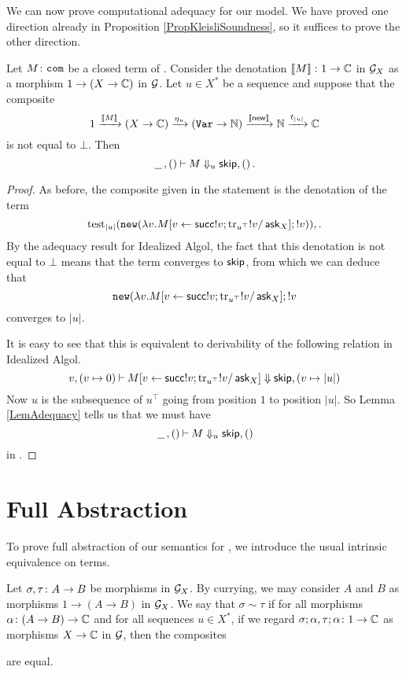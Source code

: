 \documentclass[11pt]{report}
\begin{document}
We can now prove computational adequacy for our model.
We have proved one direction already in Proposition \ref{PropKleisliSoundness}, so it suffices to prove the other direction.

\begin{proposition}
  Let $M\colon {\mathtt{com}}$ be a closed term of \IAX.  
  Consider the denotation $\left\llbracket M\right\rrbracket\colon 1 \to \mathbb{C}$ in $\mathcal G_X$ as a morphism $1 \to (X \to \mathbb{C})$ in $\mathcal G$.  
  Let $u\in X^*$ be a sequence and suppose that the composite
  \[
    1 \xrightarrow{\left\llbracket M\right\rrbracket}
    (X \to \mathbb{C}) \xrightarrow{\eta_u}
    ({\mathtt{Var}} \to \mathbb{N}) \xrightarrow{\left\llbracket\operatorname{{\mathsf{new}}}\right\rrbracket}
    \mathbb{N} \xrightarrow{t_{|u|}}
    \mathbb{C}
    \]
  is not equal to $\bot$.  
  Then
  \[
    \,\underline{\hspace{1.5ex}}\,,()\mathbin{\vdash} M\Downarrow_u {\mathsf{skip}},()\,.
    \]
  \label{PropKleisliAdequacy}
\end{proposition}
\begin{proof}
  As before, the composite given in the statement is the denotation of the term
  \[
    \operatorname{test}_{|u|} ({\mathtt{new}} (\lambda v.M[v\gets \operatorname{{\mathsf{succ}}} !v;\operatorname{tr}_{u^\top} !v/\operatorname{{\mathsf{ask}}}_X];!v))\\,.
    \]
  By the adequacy result for Idealized Algol, the fact that this denotation is not equal to $\bot$ means that the term converges to ${\mathsf{skip}}$, from which we can deduce that
  \[
    {\mathtt{new}} (\lambda v.M[v\gets \operatorname{{\mathsf{succ}}} !v;\operatorname{tr}_{u^\top} !v/\operatorname{{\mathsf{ask}}}_X];!v
    \]
  converges to $|u|$.

  It is easy to see that this is equivalent to derivability of the following relation in Idealized Algol.
  \[
    v,(v\mapsto 0) \mathbin{\vdash} M[v\gets \operatorname{{\mathsf{succ}}} !v;\operatorname{tr}_{u^\top} !v/\operatorname{{\mathsf{ask}}}_X] \Downarrow {\mathsf{skip}},(v\mapsto |u|)
    \]
  Now $u$ is the subsequence of $u^\top$ going from position $1$ to position $|u|$.  
  So Lemma \ref{LemAdequacy} tells us that we must have
  \[
    \,\underline{\hspace{1.5ex}}\,,()\mathbin{\vdash} M \Downarrow_u {\mathsf{skip}},()
    \]
  in \IAX.
\end{proof}

\section{Full Abstraction}

To prove full abstraction of our semantics for \IAX, we introduce the usual intrinsic equivalence on terms.

\begin{definition}
  Let $\sigma,\tau\colon A \to B$ be morphisms in $\mathcal G_X$.  
  By currying, we may consider $A$ and $B$ as morphisms $1 \to (A \to B)$ in $\mathcal G_X$.
  We say that $\sigma\sim\tau$ if for all morphisms $\alpha\colon (A \to B) \to \mathbb{C}$ and for all sequences $u\in X^*$, if we regard $\sigma;\alpha,\tau;\alpha\colon 1 \to \mathbb{C}$ as morphisms $X \to \mathbb{C}$ in $\mathcal G$, then the composites
  are equal.
\end{definition}
\end{document}
